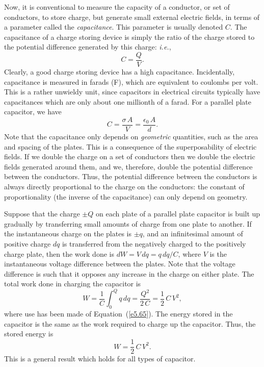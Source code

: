 Now, it is conventional to measure the capacity of a conductor, or set of conductors,
to store charge, but generate small external electric fields, in terms of a parameter
called the {\em capacitance}. This parameter is
usually denoted $C$. The capacitance of a charge storing
device is simply the ratio of the charge stored to the potential difference
generated by this charge: {\em i.e.}, 
\begin{equation}\label{e5.65}
C = \frac{Q}{V}.
\end{equation}
Clearly, a good charge storing device has a high capacitance. Incidentally,
capacitance is measured in farads (F), which are equivalent to coulombs per volt. This is a rather unwieldy
unit, since
capacitors in electrical circuits typically have capacitances which are only about one millionth
of a farad. For a parallel plate capacitor, we have
\begin{equation}\label{e5.66}
C = \frac{\sigma\,A}{V} = \frac{\epsilon_0\,A}{d}.
\end{equation}
Note that the capacitance only depends on {\em geometric}\/ quantities, such as the area
and spacing of the plates. This is a consequence of the superposability of
electric fields. If we double the charge on a set of conductors then we double
the electric fields generated around them, and we, therefore, double the potential
difference between the conductors. Thus, the potential difference between
the conductors is always directly proportional to the charge on the conductors:
 the constant
of proportionality (the inverse of the capacitance) can only depend on geometry.

Suppose that the charge $\pm Q$ on each plate of a parallel plate capacitor is built up gradually by transferring
small amounts of charge from one plate to another. If the 
instantaneous charge on the plates is $\pm q$, and an infinitesimal amount of
positive
charge $dq$ is transferred from the negatively charged  to the positively
charge plate, then the work done is $dW= V\,dq = q\,dq/C$, 
where $V$ is the instantaneous
voltage difference between the plates. Note that the voltage difference is such
that it opposes any increase in  the charge on either plate. 
The total work done in charging the capacitor
is
\begin{equation}\label{e5.67}
W =\frac{1}{C}  \int_0^Q q \,dq =  \frac{Q^2}{2\,C} = \frac{1}{2}\,C\,V^2,
\end{equation}
where use has been made of Equation~(\ref{e5.65}). 
The energy stored in the capacitor is  the same as the work required to
charge up the capacitor. Thus, the stored energy is
\begin{equation}
W= \frac{1}{2}\, C \,V^2.
\end{equation}
This is a general result which holds for all types of capacitor. 

